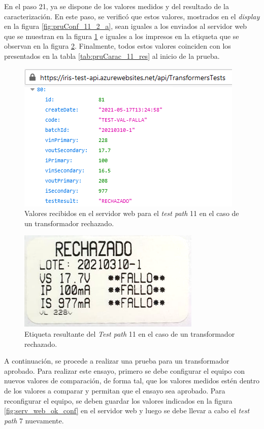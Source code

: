 En el paso 21, ya se dispone de los valores medidos y del resultado de la caracterización. En este paso, se verificó que estos valores, mostrados en el \textit{display} en la figura \ref{fig:pruConf_11_2_a}, sean iguales a los enviados al servidor web que se muestran en la figura \ref{fig:serv_web_falla_resul} e iguales a los impresos en la etiqueta que se observan en la figura \ref{fig:etiqueta_falla}. Finalmente, todos estos valores coinciden con los presentados en la tabla \ref{tab:pruCarac_11_res} al inicio de la prueba.

\begin{figure}[htpb]
	\centering
	\includegraphics[scale=0.9]{./Figures/serv_web_falla_resul.png}
	\caption{Valores recibidos en el servidor web para el \textit{test path} 11 en el caso de un transformador rechazado.}
	\label{fig:serv_web_falla_resul}
\end{figure}

\begin{figure}[htpb]
	\centering
	\includegraphics[scale=0.7]{./Figures/etiqueta_falla.png}
	\caption{Etiqueta resultante del \textit{Test path} 11 en el caso de un transformador rechazado.}
	\label{fig:etiqueta_falla}
\end{figure}

\pagebreak

A continuación, se procede a realizar una prueba para un transformador aprobado. Para realizar este ensayo, primero se debe configurar el equipo con nuevos valores de comparación, de forma tal, que los valores medidos estén dentro de los valores a comparar y permitan que el ensayo sea aprobado. Para reconfigurar el equipo, se deben guardar los valores indicados en la figura \ref{fig:serv_web_ok_conf} en el servidor web y luego se debe llevar a cabo el \textit{test path} 7 nuevamente.

